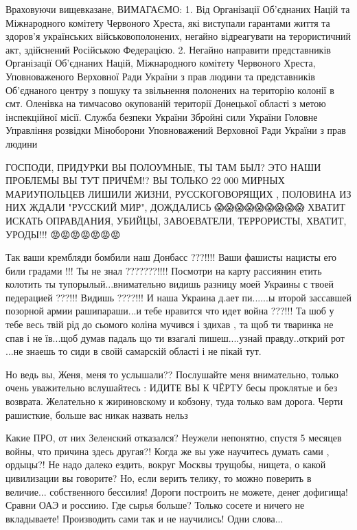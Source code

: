 Враховуючи вищевказане,
ВИМАГАЄМО:
1. Від Організації Об'єднаних Націй та Міжнародного комітету Червоного Хреста, які виступали гарантами життя та здоров'я українських військовополонених, негайно відреагувати на терористичний акт, здійснений Російською Федерацією.
2. Негайно направити представників Організації Об'єднаних Націй, Міжнародного комітету Червоного Хреста, Уповноваженого Верховної Ради України з прав людини та представників Об'єднаного центру з пошуку та звільнення полонених на територію колонії в смт. Оленівка на тимчасово окупованій території Донецької області з метою інспекційної місії.
Служба безпеки України
Збройні сили України
Головне Управління розвідки Міноборони
Уповноважений Верховної Ради України з прав людини

ГОСПОДИ, ПРИДУРКИ ВЫ ПОЛОУМНЫЕ, ТЫ ТАМ БЫЛ? ЭТО НАШИ ПРОБЛЕМЫ ВЫ ТУТ ПРИЧЁМ!?
ВЫ ТОЛЬКО 22 000 МИРНЫХ МАРИУПОЛЬЦЕВ ЛИШИЛИ ЖИЗНИ, РУССКОГОВОРЯЩИХ , ПОЛОВИНА
ИЗ НИХ ЖДАЛИ "РУССКИЙ МИР", ДОЖДАЛИСЬ 😱😱😱😱😱😱😱😱😱 ХВАТИТ ИСКАТЬ
ОПРАВДАНИЯ, УБИЙЦЫ, ЗАВОЕВАТЕЛИ, ТЕРРОРИСТЫ, ХВАТИТ, УРОДЫ!!! 😡😡😡😡😡😡😡

Так ваши крембляди бомбили наш Донбасс ???!!!! Ваши фашисты нацисты его били
градами !!! Ты не знал ???????!!!! Посмотри на карту рассиянин етить колотить
ты тупорылый...внимательно видишь разницу моей Украины с твоей педерацией
???!!! Видишь ????!!! И наша Украина д.ает пи......ы второй зассавшей позорной
армии рашипараши...и тебе нравится что идет война ???!!! Та шоб у тебе весь
твій рід до сьомого коліна мучився і здихав , та щоб ти тваринка не спав і не
їв...щоб думав падаль що ти взагалі пишеш....узнай правду..открий рот ...не
знаешь то сиди в своїй самарскій області і не пікай тут.

Но ведь вы, Женя, меня то услышали?? Послушайте меня внимательно, только очень
уважительно вслушайтесь : ИДИТЕ ВЫ К ЧЁРТУ бесы проклятые и без возврата.
Желательно к жириновскому и кобзону, туда только вам дорога. Черти рашисткие,
больше вас никак назвать нельз

Какие ПРО, от них Зеленский отказался? Неужели непонятно, спустя 5 месяцев
войны, что причина здесь другая?! Когда же вы уже научитесь думать сами ,
ордыцы?! Не надо далеко ездить, вокруг Москвы трущобы, нищета, о какой
цивилизации вы говорите? Но, если верить телику, то можно поверить в величие...
собственного бессилия! Дороги построить не можете, денег дофигища! Сравни ОАЭ и
россиию. Где сырья больше? Только сосете и ничего не вкладываете! Производить
сами так и не научились! Одни слова...

